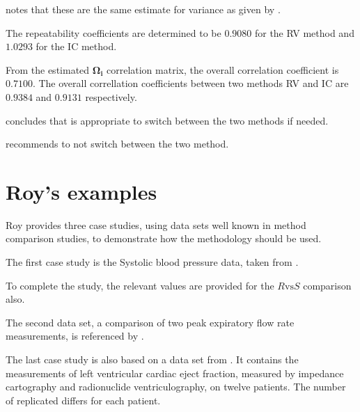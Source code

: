 \documentclass[12pt, a4paper]{report}
\theoremstyle{plain}
\theoremstyle{definition}
\theoremstyle{remark}
\begin{document}
	\citet{roy} notes that these are the same estimate for variance as given by \citet{BA99}.
	
	
	The repeatability coefficients are determined to be $0.9080$ for the RV method and $1.0293$ for the IC method.
	
	From the estimated $\boldsymbol{\Omega_{i}}$ correlation matrix, the overall correlation coefficient is $0.7100$.
	The overall correllation coefficients between two methods RV and IC are $0.9384$ and $0.9131$ respectively.
	
	\citet{roy} concludes that is appropriate to switch between the two methods if needed.
	
	
	\citet{haber}
	
	\citet{roy} recommends to not switch between the two method.
	
	
	\section{Roy's examples}
	Roy provides three case studies, using data sets well known in method comparison studies, to demonstrate how the methodology should be used.
	
	
	
	The first case study is the Systolic blood pressure data, taken from \citet{BA99}.
	
	
	
	To complete the study, the relevant values are provided for the $R \mbox{vs} S$ comparison also.
	
	
	The second data set, a comparison of two peak expiratory flow rate measurements, is referenced by \citet{BA86}.
	
	
	The last case study is also based on a data set from  \citet{BA99}. It contains the measurements of left ventricular cardiac eject fraction, measured by impedance cartography and radionuclide ventriculography, on twelve patients.
	The number of replicated differs for each patient.
	
\end{document}
